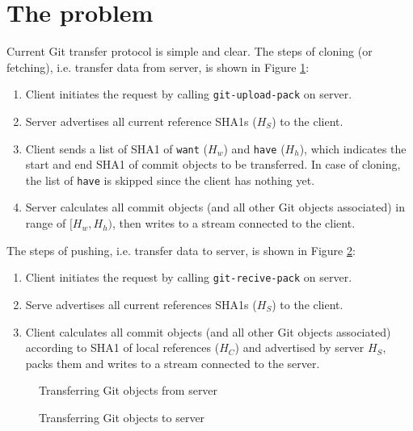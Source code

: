 \documentclass[preprint]{sigplanconf}
\begin{document}
\section{The problem}
Current Git transfer protocol is simple and clear.
The steps of cloning (or fetching), i.e. transfer data from server, is shown in Figure \ref{fig:git-proto-clone-seq}:

\begin{enumerate}
  \item Client initiates the request by calling \verb|git-upload-pack| on server.
  \item Server advertises all current reference SHA1s ($H_S$) to the client.
  \item Client sends a list of SHA1 of \verb|want| ($H_w$) and \verb|have| ($H_h$), which indicates the start and end SHA1 of commit objects to be transferred.
    In case of cloning, the list of \verb|have| is skipped since the client has nothing yet.
  \item Server calculates all commit objects (and all other Git objects associated) in range of $[H_w, H_h)$, then writes to a stream connected to the client.
\end{enumerate}

The steps of pushing, i.e. transfer data to server, is shown in Figure \ref{fig:git-proto-push-seq}:
\begin{enumerate}
  \item Client initiates the request by calling \verb|git-recive-pack| on server.
  \item Serve advertises all current references SHA1s ($H_S$) to the client.
  \item Client calculates all commit objects (and all other Git objects associated) according to SHA1 of local references ($H_C$) and advertised by server $H_S$, packs them and writes to a stream connected to the server.
\end{enumerate}

\begin{figure}
  \centering
  
  \caption{Transferring Git objects from server}
  \label{fig:git-proto-clone-seq}
\end{figure}

\begin{figure}
  \centering
  
  \caption{Transferring Git objects to server}
  \label{fig:git-proto-push-seq}
\end{figure}
\end{document}
